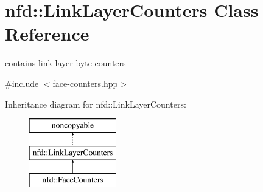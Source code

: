 \hypertarget{classnfd_1_1LinkLayerCounters}{}\section{nfd\+:\+:Link\+Layer\+Counters Class Reference}
\label{classnfd_1_1LinkLayerCounters}


contains link layer byte counters  




{\ttfamily \#include $<$face-\/counters.\+hpp$>$}

Inheritance diagram for nfd\+:\+:Link\+Layer\+Counters\+:\begin{figure}[H]
\begin{center}
\leavevmode
\includegraphics[height=3.000000cm]{classnfd_1_1LinkLayerCounters}
\end{center}
\end{figure}
